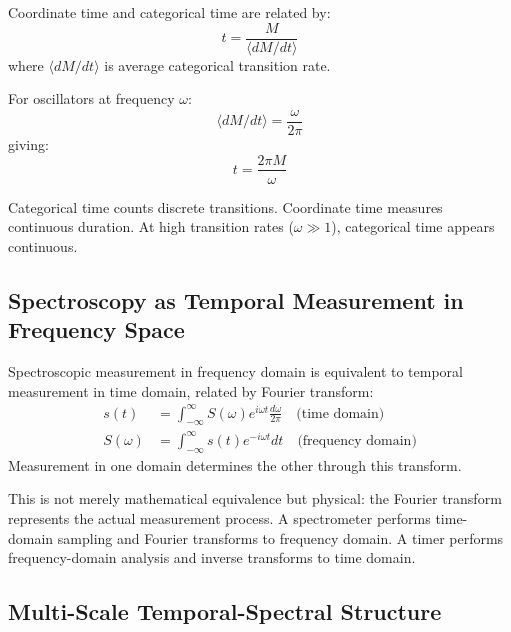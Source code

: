 \begin{proposition}
\label{prop:cat_coord_time}
Coordinate time and categorical time are related by:
\begin{equation}
t = \frac{M}{\langle dM/dt \rangle}
\end{equation}
where $\langle dM/dt \rangle$ is average categorical transition rate.

For oscillators at frequency $\omega$:
\begin{equation}
\langle dM/dt \rangle = \frac{\omega}{2\pi}
\end{equation}
giving:
\begin{equation}
t = \frac{2\pi M}{\omega}
\end{equation}
\end{proposition}

Categorical time counts discrete transitions. Coordinate time measures continuous duration. At high transition rates ($\omega \gg 1$), categorical time appears continuous.

\subsection{Spectroscopy as Temporal Measurement in Frequency Space}

\begin{proposition}
\label{prop:freq_time_reciprocity}
Spectroscopic measurement in frequency domain is equivalent to temporal measurement in time domain, related by Fourier transform:
\begin{align}
s(t) &= \int_{-\infty}^{\infty} S(\omega) e^{i\omega t} \frac{d\omega}{2\pi} \quad \text{(time domain)} \\
S(\omega) &= \int_{-\infty}^{\infty} s(t) e^{-i\omega t} dt \quad \text{(frequency domain)}
\end{align}
Measurement in one domain determines the other through this transform.
\end{proposition}

This is not merely mathematical equivalence but physical: the Fourier transform represents the actual measurement process. A spectrometer performs time-domain sampling and Fourier transforms to frequency domain. A timer performs frequency-domain analysis and inverse transforms to time domain.

\subsection{Multi-Scale Temporal-Spectral Structure}

